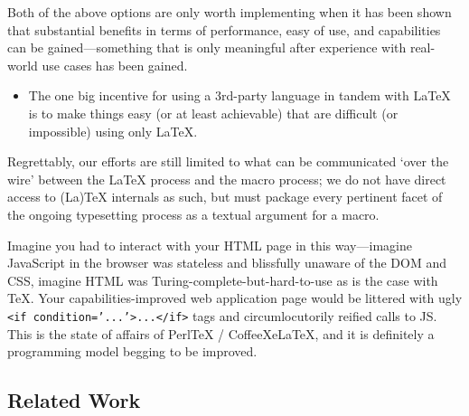 Both of the above options are only worth implementing when it has been
shown that substantial benefits in terms of performance, easy of use,
and capabilities can be gained---something that is only meaningful after
experience with real-world use cases has been gained.

\begin{itemize}
\itemsep1pt\parskip0pt
\item
  The one big incentive for using a 3rd-party language in tandem with
  LaTeX is to make things easy (or at least achievable) that are
  difficult (or impossible) using only LaTeX.
\end{itemize}

Regrettably, our efforts are still limited to what can be communicated
`over the wire' between the LaTeX process and the macro process; we do
not have direct access to (La)TeX internals as such, but must package
every pertinent facet of the ongoing typesetting process as a textual
argument for a macro.

Imagine you had to interact with your HTML page in this way---imagine
JavaScript in the browser was stateless and blissfully unaware of the
DOM and CSS, imagine HTML was Turing-complete-but-hard-to-use as is the
case with TeX. Your capabilities-improved web application page would be
littered with ugly
\texttt{\textless{}if condition='...'\textgreater{}...\textless{}/if\textgreater{}}
tags and circumlocutorily reified calls to JS. This is the state of
affairs of PerlTeX / CoffeeXeLaTeX, and it is definitely a programming
model begging to be improved.

\subsection{Related Work}\label{related-work}


